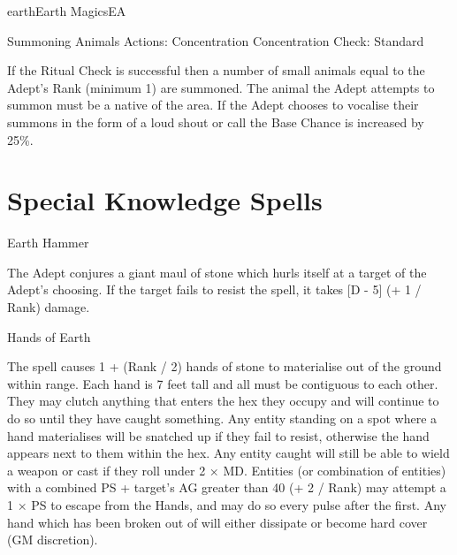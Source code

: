 \begin{College}[1.2]{earth}{Earth Magics}{EA}
\begin{ritual}[Q-1]{Summoning Animals}
Actions: Concentration 
Concentration Check: Standard 
\begin{effects}
If the Ritual Check is successful then a number of small animals equal
to the Adept’s Rank (minimum 1) are summoned. The animal the Adept
attempts to summon must be a native of the area. If the Adept chooses
to vocalise their summons in the form of a loud shout or call the Base
Chance is increased by 25\%.
\end{effects}
\end{ritual}

\section{Special Knowledge Spells}

\begin{spell}[S-1]{Earth Hammer}

\begin{effects}
The Adept conjures a giant maul of stone which hurls itself at a
target of the Adept’s choosing. If the target fails to resist the
spell, it takes [D - 5] (+ 1 / Rank) damage.
\end{effects}
\end{spell}

\begin{spell}[S-2]{Hands of Earth}

\begin{effects}
The spell causes 1 + (Rank / 2) hands of stone to materialise out of
the ground within range.  Each hand is 7 feet tall and all must be
contiguous to each other. They may clutch anything that enters the hex
they occupy and will continue to do so until they have caught
something.  Any entity standing on a spot where a hand materialises
will be snatched up if they fail to resist, otherwise the hand appears
next to them within the hex.  Any entity caught will still be able to
wield a weapon or cast if they roll under 2 × MD. Entities (or
combination of entities) with a combined PS + target’s AG greater than
40 (+ 2 / Rank) may attempt a 1 × PS to escape from the Hands, and may
do so every pulse after the first.  Any hand which has been broken out
of will either dissipate or become hard cover (GM discretion).
\end{effects}
\end{spell}


\end{College}
